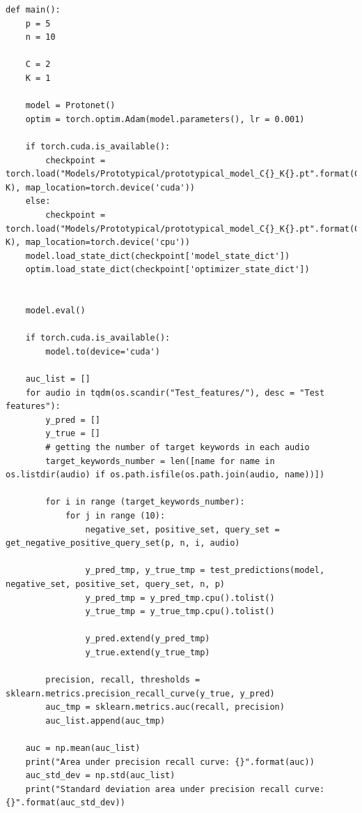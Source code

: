 \documentclass[12pt,a4paper,titlepage]{article}
\begin{document}
\begin{lstlisting}[language=iPython,firstnumber=77, caption=protonet\_test.py, label=protonet_test,captionpos=b]
def main():
    p = 5
    n = 10

    C = 2
    K = 1

    model = Protonet()
    optim = torch.optim.Adam(model.parameters(), lr = 0.001)

    if torch.cuda.is_available():
        checkpoint = torch.load("Models/Prototypical/prototypical_model_C{}_K{}.pt".format(C, K), map_location=torch.device('cuda'))
    else:
        checkpoint = torch.load("Models/Prototypical/prototypical_model_C{}_K{}.pt".format(C, K), map_location=torch.device('cpu'))
    model.load_state_dict(checkpoint['model_state_dict'])
    optim.load_state_dict(checkpoint['optimizer_state_dict'])


    model.eval()

    if torch.cuda.is_available():
        model.to(device='cuda')

    auc_list = []
    for audio in tqdm(os.scandir("Test_features/"), desc = "Test features"):
        y_pred = []
        y_true = []
        # getting the number of target keywords in each audio
        target_keywords_number = len([name for name in os.listdir(audio) if os.path.isfile(os.path.join(audio, name))])

        for i in range (target_keywords_number):
            for j in range (10):
                negative_set, positive_set, query_set = get_negative_positive_query_set(p, n, i, audio)  

                y_pred_tmp, y_true_tmp = test_predictions(model, negative_set, positive_set, query_set, n, p)
                y_pred_tmp = y_pred_tmp.cpu().tolist()
                y_true_tmp = y_true_tmp.cpu().tolist()
                
                y_pred.extend(y_pred_tmp)
                y_true.extend(y_true_tmp)

        precision, recall, thresholds = sklearn.metrics.precision_recall_curve(y_true, y_pred)
        auc_tmp = sklearn.metrics.auc(recall, precision)
        auc_list.append(auc_tmp)
        
    auc = np.mean(auc_list)
    print("Area under precision recall curve: {}".format(auc))
    auc_std_dev = np.std(auc_list)
    print("Standard deviation area under precision recall curve: {}".format(auc_std_dev))
\end{lstlisting}
\end{document}
